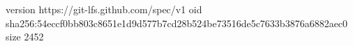 version https://git-lfs.github.com/spec/v1
oid sha256:54eccf0bb803c8651e1d9d577b7cd28b524be73516de5c7633b3876a6882aec0
size 2452
